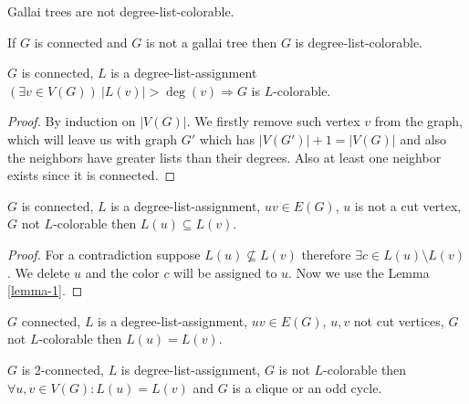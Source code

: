 \begin{observ}
	Gallai trees are not degree-list-colorable.
\end{observ}

\begin{thm}[Brooks]
	If $G$ is connected and $G$ is not a gallai tree then $G$ is degree-list-colorable.
	\label{brooks-thm}
\end{thm}

\begin{lemma}
	$G$ is connected, $L$ is a degree-list-assignment $(\exists v \in V(G)) \ |L(v)| > \deg(v) \Rightarrow G$ is $L$-colorable.
	\label{lemma-1}
\end{lemma}

\begin{proof}
	By induction on $|V(G)|$. We firstly remove such vertex $v$ from the graph, which will leave us with graph $G'$ which has $|V(G')| + 1 = |V(G)|$ and also the neighbors have greater lists than their degrees. Also at least one neighbor exists since it is connected.
\end{proof}

\begin{lemma}
	$G$ is connected, $L$ is a degree-list-assignment, $uv \in E(G)$, $u$ is not a cut vertex, $G$ not $L$-colorable then $L(u) \subseteq L(v)$.
\end{lemma}

\begin{proof}
	For a contradiction suppose $L(u) \nsubseteq L(v)$ therefore $\exists c \in L(u) \setminus L(v)$. We delete $u$ and the color $c$ will be assigned to $u$. Now we use the Lemma \ref{lemma-1}.
\end{proof}

\begin{cor}
	$G$ connected, $L$ is a degree-list-assignment, $uv \in E(G)$, $u,v$ not cut vertices, $G$ not $L$-colorable then $L(u) = L(v)$.
\end{cor}

\begin{cor}
	$G$ is 2-connected, $L$ is degree-list-assignment, $G$ is not $L$-colorable then $\forall u,v \in V(G) : L(u) = L(v)$ and $G$ is a clique or an odd cycle.
\end{cor}

